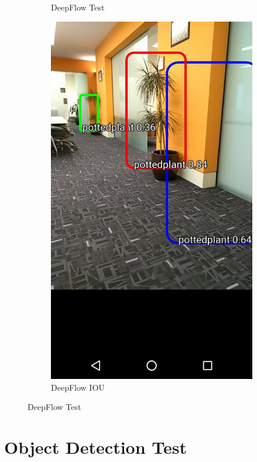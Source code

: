 \begin{figure}
\begin{subfigure}{.4\textwidth}
  \caption{DeepFlow  Test}
  \label{fig:deepFlow_graph}
\end{subfigure}
\begin{subfigure}{.4\textwidth}
  \centering
  \includegraphics[width=.5\linewidth]{figures/test_6.jpeg}
  \caption{DeepFlow IOU}
  \label{fig:DeepFlow_IOU}
\end{subfigure}
\caption{DeepFlow  Test}
\label{fig:deep_accuracy}
\end{figure}


\section{Object Detection Test}

